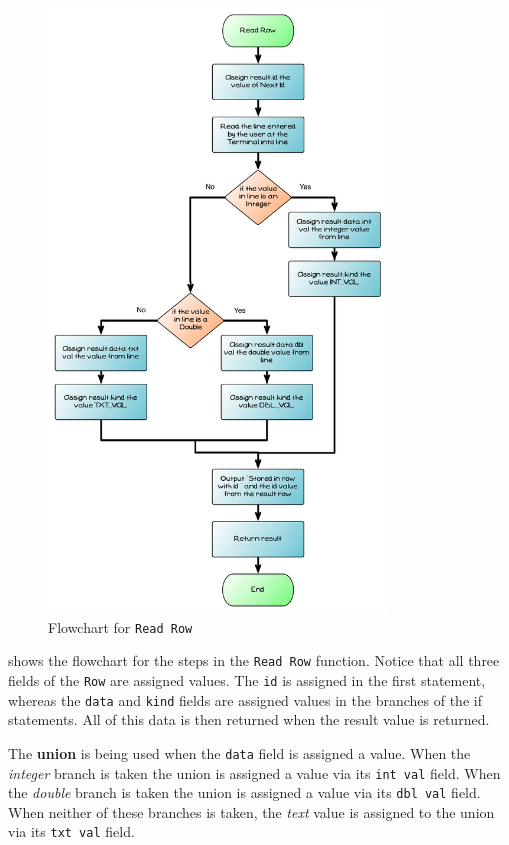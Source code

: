\begin{figure}[p]
   \centering
   \includegraphics[width=0.80\textwidth]{./topics/type-decl/diagrams/ReadRowFlow} 
   \caption{Flowchart for \texttt{Read Row}}
   \label{fig:read-row-flow}
\end{figure}

 shows the flowchart for the steps in the \texttt{Read Row} function. Notice that all three fields of the \texttt{Row} are assigned values. The \texttt{id} is assigned in the first statement, whereas the \texttt{data} and \texttt{kind} fields are assigned values in the branches of the if statements. All of this data is then returned when the result value is returned.

The \textbf{union} is being used when the \texttt{data} field is assigned a value. When the \emph{integer} branch is taken the union is assigned a value via its \texttt{int val} field. When the \emph{double} branch is taken the union is assigned a value via its \texttt{dbl val} field. When neither of these branches is taken, the \emph{text} value is assigned to the union via its \texttt{txt val} field.

